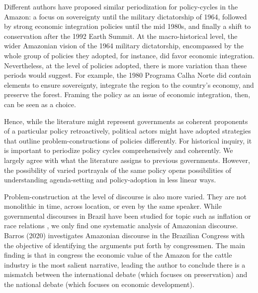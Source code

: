 \documentclass[
]{article}
\begin{document}
Different authors have proposed similar periodization for policy-cycles
in the Amazon: a focus on sovereignty until the military dictatorship of
1964, followed by strong economic integration policies until the mid
1980s, and finally a shift to conservation after the 1992 Earth Summit.
At the macro-historical level, the wider Amazonian vision of the 1964
military dictatorship, encompassed by the whole group of policies they
adopted, for instance, did favor economic integration. Nevertheless, at
the level of policies adopted, there is more variation than these
periods would suggest. For example, the 1980 Programa Calha Norte did
contain elements to ensure sovereignty, integrate the region to the
country's economy, and preserve the forest. Framing the policy as an
issue of economic integration, then, can be seen as a choice.

Hence, while the literature might represent governments as coherent
proponents of a particular policy retroactively, political actors might
have adopted strategies that outline problem-constructions of policies
differently. For historical inquiry, it is important to periodize policy
cycles comprehensively and coherently. We largely agree with what the
literature assigns to previous governments. However, the possibility of
varied portrayals of the same policy opens possibilities of
understanding agenda-setting and policy-adoption in less linear ways.

Problem-construction at the level of discourse is also more varied. They
are not monolithic in time, across location, or even by the same
speaker. While governmental discourses in Brazil have been studied for
topic such as inflation or race relations , we only find one systematic
analysis of Amazonian discourse. Barros (2020) investigates Amazonian
discourse in the Brazilian Congress with the objective of identifying
the arguments put forth by congressmen. The main finding is that in
congress the economic value of the Amazon for the cattle industry is the
most salient narrative, leading the author to conclude there is a
mismatch between the international debate (which focuses on
preservation) and the national debate (which focuses on economic
development).
\end{document}
